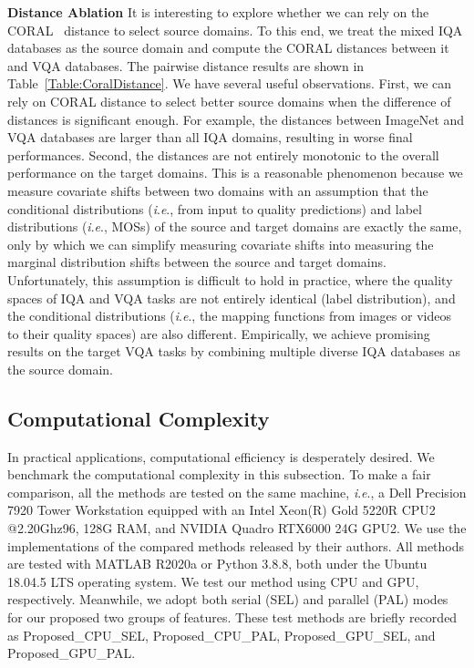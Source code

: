 \documentclass[journal]{IEEEtran}
\newcommand{\ie}{\textit{i}.\textit{e}.}
\begin{document}
{{\textbf{Distance Ablation} It is interesting to explore whether we can rely on the CORAL~\cite{sun2016deep} distance to select source domains. To this end, we treat the mixed IQA databases as the source domain and compute the CORAL distances between it and VQA databases. The pairwise distance results are shown in Table~\ref{Table:CoralDistance}. We have several useful observations. First, we can rely on CORAL distance to select better source domains when the difference of distances is significant enough. For example, the distances between ImageNet and VQA databases are larger than all IQA domains, resulting in worse final performances. Second, the distances are not entirely monotonic to the overall performance on the target domains. This is a reasonable phenomenon because we measure covariate shifts between two domains with an assumption that the conditional distributions (\ie, from input to quality predictions) and label distributions (\ie, MOSs) of the source and target domains are exactly the same, only by which we can simplify measuring covariate shifts into measuring the marginal distribution shifts between the source and target domains. Unfortunately, this assumption is difficult to hold in practice, where the quality spaces of IQA and VQA tasks are not entirely identical (label distribution), and the conditional distributions (\ie, the mapping functions from images or videos to their quality spaces) are also different. Empirically, we achieve promising results on the target VQA tasks by combining multiple diverse IQA databases as the source domain.






\subsection{Computational Complexity}\label{subsec:ComputationAnalysis}
In practical applications, computational efficiency is desperately desired. We benchmark the computational complexity in this subsection. To make a fair comparison, all the methods are tested on the same machine, \ie, a Dell Precision 7920 Tower Workstation equipped with an Intel Xeon(R) Gold 5220R CPU2 @2.20Ghz96, 128G RAM, and NVIDIA Quadro RTX6000 24G GPU2. We use the implementations of the compared methods released by their authors. All methods are tested with MATLAB R2020a or Python 3.8.8, both under the Ubuntu 18.04.5 LTS operating system. We test our method using CPU and GPU, respectively. Meanwhile, we adopt both serial (SEL) and parallel (PAL) modes for our proposed two groups of features. These test methods are briefly recorded as Proposed\_CPU\_SEL, Proposed\_CPU\_PAL, Proposed\_GPU\_SEL, and Proposed\_GPU\_PAL.

}}
\end{document}
